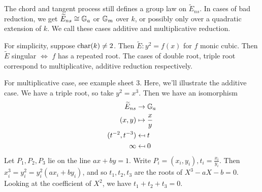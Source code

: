 \documentclass[10pt,a4paper]{article}
\begin{document}
The chord and tangent process still defines a group law on $\tilde{E}_{ns}$. In cases of bad reduction, we get $\widetilde{E}_{ns} \cong \mathbb{G}_a$ or $\mathbb{G}_m$ over $k$, or possibly only over a quadratic extension of $k$. We call these cases additive and multiplicative reduction.

For simplicity, suppose $\operatorname{char}(k) \neq 2$. Then $\tilde{E}: y^2 = f(x)$ for $f$ monic cubic. Then $\tilde{E}$ singular $\iff$ $f$ has a repeated root. The cases of double root, triple root correspond to multiplicative, additive reduction respectively.

For multiplicative case, see example sheet 3. Here, we'll illustrate the additive case. We have a triple root, so take $y^2 = x^3$. Then we have an isomorphism
\begin{align*}
  \widetilde{E}_{ns} & \to \mathbb{G}_a\\
  (x, y) &\mapsto \frac{x}{y}\\
  (t^{-2}, t^{-3}) &\mapsfrom t\\
  \infty &\mapsfrom 0
\end{align*}
Let $P_1, P_2, P_3$ lie on the line $ax+by=1$. Write $P_i = (x_i, y_i), t_i = \frac{x_i}{y_i}$. Then $x_i^3 = y_i^2 = y_i^2(ax_i+by_i)$, and so $t_1, t_2, t_3$ are the roots of $X^3-aX-b = 0$. Looking at the coefficient of $X^2$, we have $t_1+t_2+t_3 = 0$.
\end{document}
